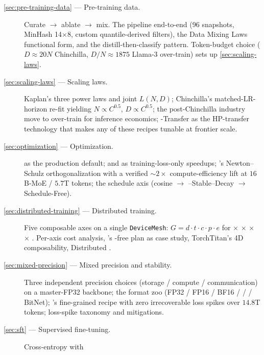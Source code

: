 \begin{description}
\item[\cref{sec:pre-training-data} --- Pre-training data.] Curate
  $\to$ ablate $\to$ mix. The  pipeline end-to-end (96 
  snapshots, MinHash 14$\times$8, custom quantile-derived filters), the
  Data Mixing Laws functional form, and the 
  distill-then-classify pattern. Token-budget choice ($D \approx 20N$
  Chinchilla, $D/N \approx 1875$ Llama-3 over-train) sets up
  \cref{sec:scaling-laws}.
\item[\cref{sec:scaling-laws} --- Scaling laws.] Kaplan's three power
  laws and joint $L(N, D)$; Chinchilla's matched-LR-horizon re-fit
  yielding $N \propto C^{0.5},\, D \propto C^{0.5}$; the post-Chinchilla
  industry move to over-train for inference economics; \textmu-Transfer
  as the HP-transfer technology that makes any of these recipes tunable
  at frontier scale.
\item[\cref{sec:optimization} --- Optimization.]  as the
  production default;  and  as training-loss-only speedups;
  's Newton--Schulz orthogonalization with a verified
  $\sim\!2\times$ compute-efficiency lift at $16$B-MoE / $5.7$T tokens;
  the schedule axis (cosine $\to$ --Stable--Decay $\to$
  Schedule-Free).
\item[\cref{sec:distributed-training} --- Distributed training.] Five
  composable axes on a single \texttt{DeviceMesh}:
  $G = d \cdot t \cdot c \cdot p \cdot e$ for  $\times$  $\times$
   $\times$  $\times$ . Per-axis cost analysis, 's
  -free plan as case study, TorchTitan's 4D composability,
  Distributed .
\item[\cref{sec:mixed-precision} --- Mixed precision and stability.]
  Three independent precision choices (storage / compute /
  communication) on a master-FP32 backbone; the format zoo
  (FP32 / FP16 / BF16 /  /  / BitNet); 's
  fine-grained  recipe with zero irrecoverable loss spikes over
  $14.8$T tokens; loss-spike taxonomy and mitigations.
\item[\cref{sec:sft} --- Supervised fine-tuning.] Cross-entropy with

\end{description}
